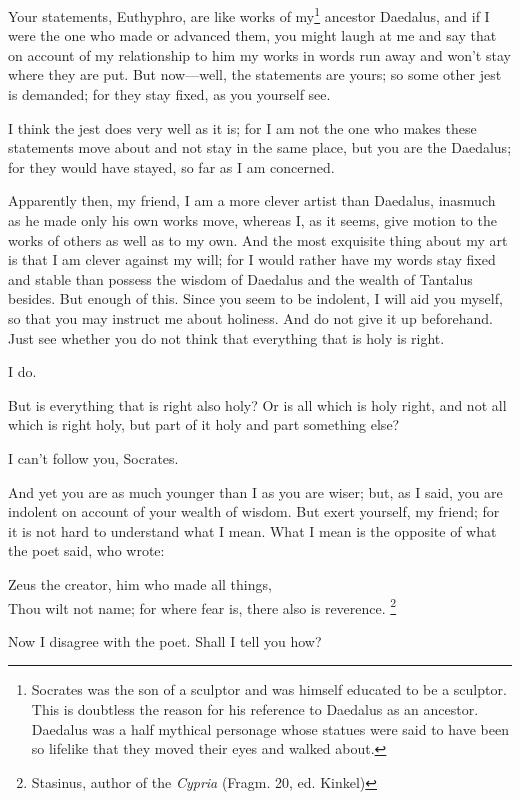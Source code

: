 \documentclass[letterpaper,12pt]{article}
\newcommand{\stephpag}[1]{\marginnote{\small\itshape\fontfamily{ppl}\selectfont #1}}
\begin{document}
\begin{drama}
\socratesspeaks
Your statements, Euthyphro, \stephpag{c} are like works of my\footnote{Socrates was the son of a sculptor and was himself educated to be a sculptor. This is doubtless the reason for his reference to Daedalus as an ancestor. Daedalus was a half mythical personage whose statues were said to have been so lifelike that they moved their eyes and walked about.} ancestor Daedalus, and if I were the one who made or advanced them, you might laugh at me and say that on account of my relationship to him my works in words run away and won't stay where they are put. But now—well, the statements are yours; so some other jest is demanded; for they stay fixed, as you yourself see.

\euthyphrospeaks
I think the jest does very well as it is; \stephpag{d} for I am not the one who makes these statements move about and not stay in the same place, but you are the Daedalus; for they would have stayed, so far as I am concerned.

\socratesspeaks
Apparently then, my friend, I am a more clever artist than Daedalus, inasmuch as he made only his own works move, whereas I, as it seems, give motion to the works of others as well as to my own. \stephpag{e} And the most exquisite thing about my art is that I am clever against my will; for I would rather have my words stay fixed and stable than possess the wisdom of Daedalus and the wealth of Tantalus besides. But enough of this. Since you seem to be indolent, I will aid you myself, so that you may instruct me about holiness. And do not give it up beforehand. Just see whether you do not think that everything that is holy is right.

\euthyphrospeaks
I do.

\socratesspeaks
But is everything that is right also holy? \stephpag{12 a} Or is all which is holy right, and not all which is right holy, but part of it holy and part something else?

\euthyphrospeaks
I can't follow you, Socrates.

\socratesspeaks
And yet you are as much younger than I as you are wiser; but, as I said, you are indolent on account of your wealth of wisdom. But exert yourself, my friend; for it is not hard to understand what I mean. What I mean is the opposite of what the poet said, who wrote: 
    \begin{displayquote}
        Zeus the creator, him who made all things, \stephpag{b} \\
        Thou wilt not name; for where fear is, there also is reverence. \footnote{Stasinus, author of the \emph{Cypria} (Fragm. 20, ed. Kinkel)}
    \end{displayquote}
    Now I disagree with the poet. Shall I tell you how?


\end{drama}
\end{document}

